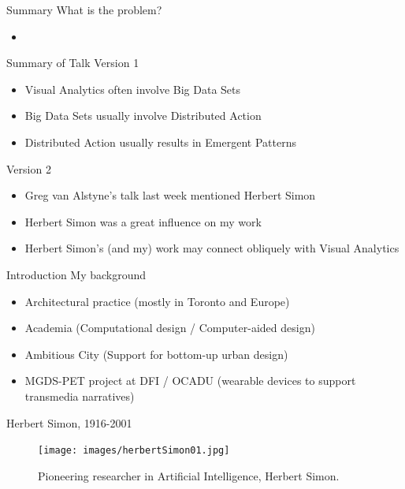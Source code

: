 \documentclass[handout]{beamer}
\begin{document}
\begin{frame}{Summary}
What is the problem?
\begin{itemize}
\item 
\end{itemize}
\pause

\begin{frame}{Summary of Talk}
Version 1
\begin{itemize}
\item Visual Analytics often involve Big Data Sets
\item Big Data Sets usually involve Distributed Action
\item Distributed Action usually results in Emergent Patterns
\end{itemize}
\pause

\bigskip
Version 2
\begin{itemize}
\item Greg van Alstyne's talk last week mentioned Herbert Simon
\item Herbert Simon was a great influence on my work
\item Herbert Simon's (and my) work may connect obliquely with Visual Analytics
\end{itemize}
\end{frame}

\begin{frame}{Introduction}
My background
	\begin{itemize}
	\item Architectural practice (mostly in Toronto and Europe)
	\item Academia (Computational design / Computer-aided design)
	\item Ambitious City (Support for bottom-up urban design)
	\item MGDS-PET project at DFI / OCADU (wearable devices to support transmedia narratives)
	\end{itemize}
\end{frame}

\begin{frame}{Herbert Simon, 1916-2001}
\begin{figure}
\begin{center}
 \texttt{[image: images/herbertSimon01.jpg]}
    
  \label{fig:herb}
  \citep{simon1996sciences}
  \caption{Pioneering researcher in Artificial Intelligence, Herbert Simon.}
\end{center}
\end{figure}
\end{frame}


\end{frame}
\end{document}
